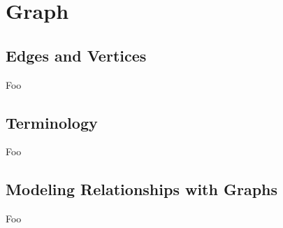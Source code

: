 \section{Graph}

\subsection{Edges and Vertices}

Foo

\subsection{Terminology}

Foo

\subsection{Modeling Relationships with Graphs}

Foo
